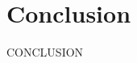 \documentclass[../NFTComp_IEEE.tex]{subfiles}
\begin{document}
\section{Conclusion}
\label{sec:conclusion}
CONCLUSION \cite{Lai2018}
\end{document}
